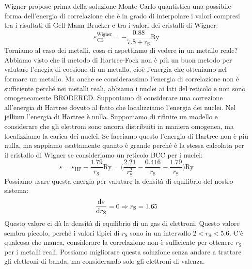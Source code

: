 Wigner propose prima della soluzione Monte Carlo quantistica una possibile forma dell'energia di correlazione che è in grado di interpolare i valori compresi tra i risultati di Gell-Mann Brucker e tra i valori dei cristalli di Wigner:
\begin{equation*}
    \varepsilon_\text{CE}^\text{Wigner}=-\frac{0.88}{7.8+r_\text{S}}\text{Ry}
\end{equation*}
Torniamo al caso dei metalli, cosa ci aspettiamo di vedere in un metallo reale? Abbiamo visto che il metodo di Hartree-Fock non è più un buon metodo per valutare l'enegia di coesione di un metallo, cioè l'energia che otteniamo nel formare un metallo. Ma anche se considerassimo l'energia di correlazione non è sufficiente perché nei metalli reali, abbiamo i nuclei ai lati del reticolo e non sono omogeneamente BRODERED. Supponiamo di considerare una correzione all'energia di Hartree dovuto al fatto che localizziamo l'energia dei nuclei. Nel jellium l'energia di Hartree è nulla. Supponiamo di rifinire un modello e considerare che gli elettroni sono ancora distribuiti in maniera omogenea, ma localizziamo la carica dei nuclei. Se facciamo questo l'energia di Hartree non è più nulla, ma sappiamo esattamente quanto è grande perché è la stessa calcolata per il cristallo di Wigner se consideriamo un reticolo BCC per i nuclei:
\begin{equation*}
    \varepsilon=\varepsilon_{\text{HF}}-\frac{1.79}{r_\text{S}}\text{Ry}=\bigg(\frac{2.21}{r_\text{S}^2}-\frac{0.416}{r_\text{S}}-\frac{1.79}{r_\text{S}}\bigg)\text{Ry}
\end{equation*}
Possiamo usare questa energia per valutare la densità di equilibrio del nostro sistema:
\begin{equation*}
    \derivative{\varepsilon}{r_\text{S}}=0 \Rightarrow r_\text{S} = 1.65
\end{equation*}
Questo valore ci dà la densità di equilibrio di un gas di elettroni. Questo valore sembra piccolo, perché i valori tipici di $r_\text{S}$ sono in un intervallo $2<r_\text{S}<5.6$. C'è qualcosa che manca, considerare la correlazione non è sufficiente per ottenere $r_\text{S}$ per i metalli reali. Possiamo migliorare questa soluzione senza andare a trattare gli elettroni di banda, ma considerando solo gli elettroni di valenza.